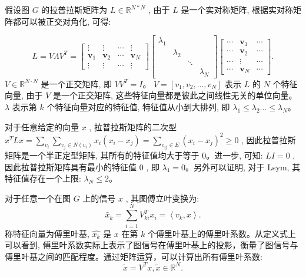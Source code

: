 假设图 \({G}\) 的拉普拉斯矩阵为 \({L} \in  \mathbb{R}^{N * N}\) , 由于 \({L}\) 是一个实对称矩阵, 根据实对称矩阵都可以被正交对角化, 可得:

\begin{equation}
L=V \Lambda V^{T}=\left[\begin{array}{cccc}
\vdots & \vdots & \cdots & \vdots \\
\boldsymbol{v}_1 & \boldsymbol{v}_2 & \cdots & \boldsymbol{v}_N \\
\vdots & \vdots & \cdots & \vdots
\end{array}\right]\left[\begin{array}{lllll}
\lambda_1 & & & \\
& \lambda_2 & & \\
& & \ddots & \\
& & & \lambda_N
\end{array}\right]\left[\begin{array}{ccc}
\cdots & \boldsymbol{v}_1 & \cdots \\
\cdots & \boldsymbol{v}_2 & \cdots \\
\cdots & \vdots & \cdots \\
\cdots & \boldsymbol{v}_N & \cdots
\end{array}\right].
\end{equation}
\({V} \in  {\mathbb{R}}^{{N} \cdot {N}}\) 是一个正交矩阵, 即 \({{{VV}}}^{{T}} = {I}\)。 \({V} = \left\lbrack  {v_{1}, v_{2}, \ldots , v_{{N}}}\right\rbrack\) 表示 \({L}\) 的 \({N}\) 个特征向量, 由于 \({V}\) 是一个正交矩阵, 这些特征向量都是彼此之间线性无关的单位向量。 \(\lambda\) 表示第 \({k}\) 个特征向量对应的特征值, 特征值从小到大排列, 即 \({\lambda }_{1} \leq  {\lambda }_{2}\ldots  \leq  {\lambda }_{{N}}\)。

对于任意给定的向量 \(x\) , 拉普拉斯矩阵的二次型 \({x}^{T}{Lx} = \sum\limits_{{v}_{i}}\sum\limits_{{{v}_{j} \in  N\left( {v}_{i}\right) }}{x}_{i}\left( {{x}_{i} - {x}_{j}}\right)  =\sum\limits_{{{{e}}_{{{ij}}} \in  {E}}}{\left( x_{{i}} - x_{{j}}\right) }^{2}  \geq  0\) , 因此拉普拉斯矩阵是一个半正定型矩阵, 其所有的特征值均大于等于 0。进一步, 可知: \({{LI}} = 0\) , 因此拉普拉斯矩阵具有最小的特征值 0 , 即 \({\lambda }_{1} = 0\)。另外可以证明, 对于 Lsym, 其特征值存在一个上限: \({\lambda }_{{N}} \leq  2\)。

对于任意一个在图 \({G}\) 上的信号 \({x}\) , 其图傅立叶变换为:
\begin{equation}
\widetilde{{x}_{k}} = \sum\limits_{{i = 1}}^{N}{V}_{ki}^{T}{x}_{i} = \left\langle  {{v}_{k}, x}\right\rangle.
\end{equation}
称特征向量为傅里叶基, \(\hat{{x}_{k}}\) 是 \({x}\) 在第 \({k}\) 个傅里叶基上的傅里叶系数。从定义式上可以看到, 傅里叶系数实际上表示了图信号在傅里叶基上的投影，衡量了图信号与傅里叶基之间的匹配程度。通过矩阵运算，可以计算出所有傅里叶系数:
\begin{equation}
\tilde{x} = {V}^{T}x, \tilde{x} \in  \mathbb{R}^{N}.
\end{equation}

